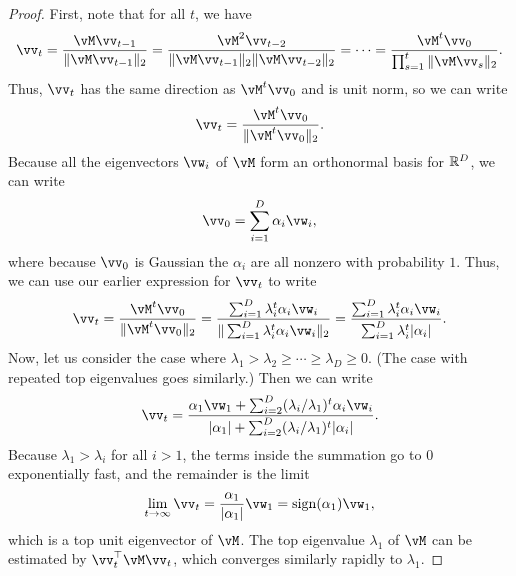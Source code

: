 \documentclass[../../book-main.tex]{subfiles}
\begin{document}
\begin{proof} First, note that for all \(t\), we have 
\begin{equation}
    \vv_{t} = \frac{\vM\vv_{t - 1}}{\norm{\vM\vv_{t - 1}}_{2}} = \frac{\vM^{2}\vv_{t - 2}}{\norm{\vM\vv_{t - 1}}_{2}\norm{\vM\vv_{t - 2}}_{2}} = \cdots = \frac{\vM^{t}\vv_{0}}{\prod_{s = 1}^{t}\norm{\vM\vv_{s}}_{2}}.
\end{equation}
Thus, \(\vv_{t}\) has the same direction as \(\vM^{t}\vv_{0}\) and is unit norm, so we can write 
\begin{equation}
    \vv_{t} = \frac{\vM^{t}\vv_{0}}{\norm{\vM^{t}\vv_{0}}_{2}}.
\end{equation}
Because all the eigenvectors \(\vw_{i}\) of $\vM$ form an orthonormal basis for \(\mathbb{R}^{D}\), we can write 
\begin{equation}
    \vv_{0} = \sum_{i = 1}^{D}\alpha_{i}\vw_{i},
\end{equation}
where because \(\vv_{0}\) is Gaussian the \(\alpha_{i}\) are all nonzero with probability \(1\). Thus, we can use our earlier expression for \(\vv_{t}\) to write
\begin{equation}
    \vv_{t} = \frac{\vM^{t}\vv_{0}}{\norm{\vM^{t}\vv_{0}}_{2}} = \frac{\sum_{i = 1}^{D}\lambda_{i}^{t}\alpha_{i}\vw_{i}}{\norm{\sum_{i = 1}^{D}\lambda_{i}^{t}\alpha_{i}\vw_{i}}_{2}} = \frac{\sum_{i = 1}^{D}\lambda_{i}^{t}\alpha_{i}\vw_{i}}{\sum_{i = 1}^{D}\lambda_{i}^{t}\abs{\alpha_{i}}}. 
\end{equation}
Now, let us consider the case where \(\lambda_{1} > \lambda_{2} \geq \cdots \geq \lambda_{D} \geq 0\). (The case with repeated top eigenvalues goes similarly.) Then we can write
\begin{equation}
    \vv_{t} = \frac{\alpha_{1}\vw_{1} + \sum_{i = 2}^{D}(\lambda_{i}/\lambda_{1})^{t}\alpha_{i}\vw_{i}}{\abs{\alpha_{1}} + \sum_{i = 2}^{D}(\lambda_{i}/\lambda_{1})^{t}\abs{\alpha_{i}}}.
\end{equation}
Because \(\lambda_{1} > \lambda_{i}\) for all \(i > 1\), the terms inside the summation go to \(0\) exponentially fast, and the remainder is the limit 
\begin{equation}
    \lim_{t \to \infty}\vv_{t} = \frac{\alpha_{1}}{\abs{\alpha_{1}}}\vw_{1} = \sign(\alpha_{1})\vw_{1},
\end{equation}
which is a top unit eigenvector of \(\vM\). The top eigenvalue \(\lambda_{1}\) of \(\vM\) can be estimated by \(\vv_{t}^{\top}\vM\vv_{t}\), which converges similarly rapidly to \(\lambda_{1}\). 
\end{proof}
\end{document}
